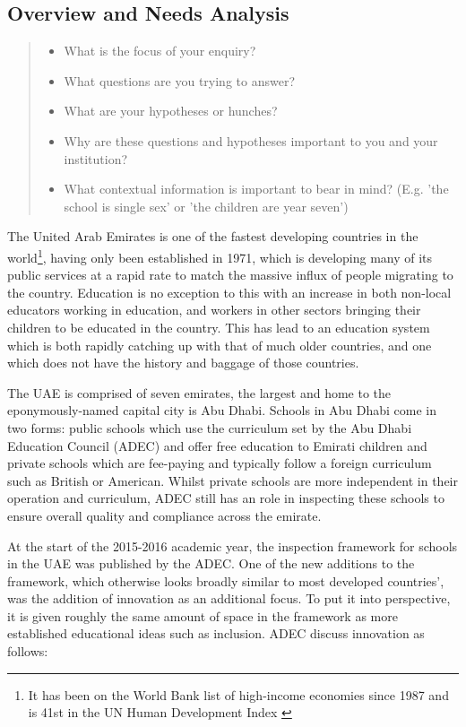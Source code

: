 \subsection{Overview and Needs Analysis}
\begin{quote}
\begin{itemize}

\item  What is the focus of your enquiry?
\item What questions are you trying to answer?
\item What are your hypotheses or hunches?
\item Why are these questions and hypotheses important to you and your institution?
\item What contextual information is important to bear in mind? (E.g. 'the school is single sex' or 'the children are year seven')

\end{itemize}
\end{quote}

The United Arab Emirates is one of the fastest developing countries in the world\footnote{It has been on the World Bank list of high-income economies since 1987 \cite{worldbank} and is 41st in the UN Human Development Index \cite{WorkforHumanDevelopment2015}}, having only been established in 1971, which is developing many of its public services at a rapid rate to match the massive influx of people migrating to the country. Education is no exception to this with an increase in both non-local educators working in education, and workers in other sectors bringing their children to be educated in the country. This has lead to an education system which is both rapidly catching up with that of much older countries, and one which does not have the history and baggage of those countries. 

The UAE is comprised of seven emirates, the largest and home to the eponymously-named capital city is Abu Dhabi. Schools in Abu Dhabi come in two forms: public schools which use the curriculum set by the Abu Dhabi Education Council (ADEC) and offer free education to Emirati children and private schools which are fee-paying and typically follow a foreign curriculum such as British or American. Whilst private schools are more independent in their operation and curriculum, ADEC still has an role in inspecting these schools to ensure overall quality and compliance across the emirate.

At the start of the 2015-2016 academic year, the inspection framework for schools in the UAE was published by the ADEC. One of the new additions to the framework, which otherwise looks broadly similar to most developed countries', was the addition of innovation as an additional focus. To put it into perspective, it is given roughly the same amount of space in the framework as more established educational ideas such as inclusion. ADEC discuss innovation as follows:

